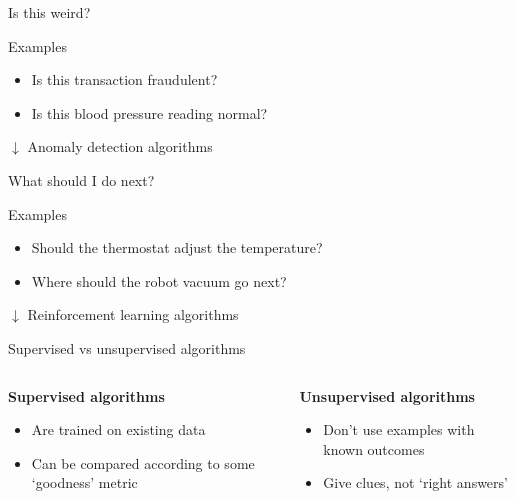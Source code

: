\begin{frame}{Is this weird?}
    \begin{block}{Examples}
        \begin{itemize}
            \item Is this transaction fraudulent?
            \item Is this blood pressure reading normal?
        \end{itemize}
    \end{block}
    \begin{center}
        \large%
        $\downarrow$
        \vfill
        \alert{Anomaly detection} algorithms
    \end{center}
\end{frame}

\begin{frame}{What should I do next?}
    \begin{block}{Examples}
        \begin{itemize}
            \item Should the thermostat adjust the temperature?
            \item Where should the robot vacuum go next?
        \end{itemize}
    \end{block}
    \begin{center}
        \large%
        $\downarrow$
        \vfill
        \alert{Reinforcement learning} algorithms
    \end{center}
\end{frame}

\begin{frame}{Supervised vs unsupervised algorithms}
    \begin{columns}
        \begin{column}{0.5\textwidth}
            \begin{center}
                \large\bf%
                Supervised algorithms
            \end{center}
            \begin{itemize}
                \item Are trained on existing data
                \item Can be compared according to some `goodness' metric
            \end{itemize}
        \end{column}
        \begin{column}{0.5\textwidth}
            \begin{center}
                \large\bf%
                Unsupervised algorithms
            \end{center}
            \begin{itemize}
                \item Don't use examples with known outcomes
                \item Give clues, not `right answers'
            \end{itemize}
        \end{column}
    \end{columns}
\end{frame}

